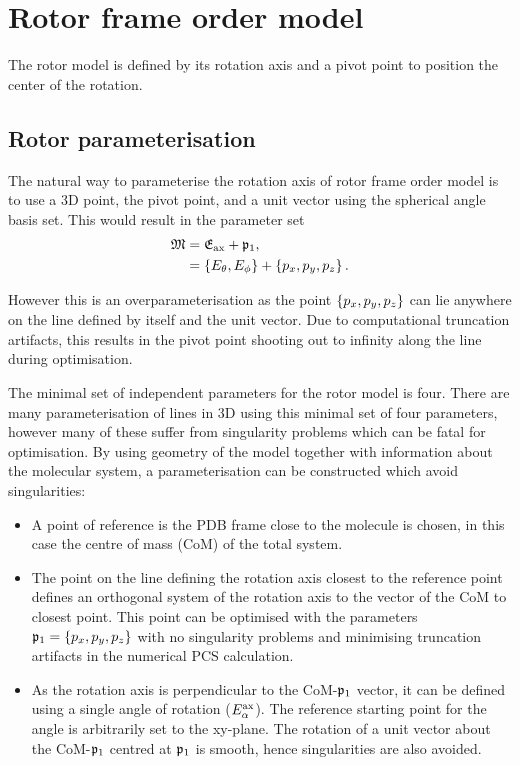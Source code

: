 \section{Rotor frame order model}

The rotor model is defined by its rotation axis and a pivot point to position the center of the rotation.


\subsection{Rotor parameterisation}

The natural way to parameterise the rotation axis of rotor frame order model is to use a 3D point, the pivot point, and a unit vector using the spherical angle basis set.
This would result in the parameter set
\begin{subequations}
\begin{align}
    \mathfrak{M} &= \mathfrak{E}_\textrm{ax} + \mathfrak{p}_1, \\
              &= \left\{ E_\theta, E_\phi \right\} + \left\{ p_x, p_y, p_z \right\}.
\end{align}
\end{subequations}

However this is an overparameterisation as the point $\left\{ p_x, p_y, p_z \right\}$ can lie anywhere on the line defined by itself and the unit vector.
Due to computational truncation artifacts, this results in the pivot point shooting out to infinity along the line during optimisation.

The minimal set of independent parameters for the rotor model is four.
There are many parameterisation of lines in 3D using this minimal set of four parameters, however many of these suffer from singularity problems which can be fatal for optimisation.
By using geometry of the model together with information about the molecular system, a parameterisation can be constructed which avoid singularities:
\begin{itemize}
    \item A point of reference is the PDB frame close to the molecule is chosen, in this case the centre of mass (CoM) of the total system.
    \item The point on the line defining the rotation axis closest to the reference point defines an orthogonal system of the rotation axis to the vector of the CoM to closest point.  This point can be optimised with the parameters $\mathfrak{p}_1 = \left\{ p_x, p_y, p_z \right\}$ with no singularity problems and minimising truncation artifacts in the numerical PCS calculation.
    \item As the rotation axis is perpendicular to the CoM-$\mathfrak{p}_1$ vector, it can be defined using a single angle of rotation ($E_\alpha^{\textrm{ax}}$).  The reference starting point for the angle is arbitrarily set to the xy-plane.  The rotation of a unit vector about the CoM-$\mathfrak{p}_1$ centred at $\mathfrak{p}_1$ is smooth, hence singularities are also avoided.
\end{itemize}


